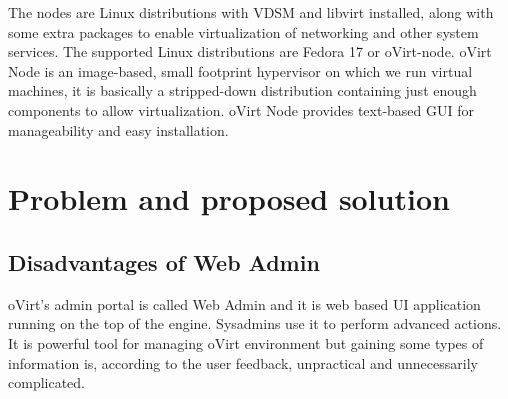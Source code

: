 The nodes are Linux distributions with VDSM and libvirt installed, along with some extra packages to enable virtualization of networking and other system services. The supported Linux distributions are Fedora 17 or oVirt-node. oVirt Node is an image-based, small footprint hypervisor on which we run virtual machines, it is basically a stripped-down distribution containing just enough components to allow virtualization. oVirt Node provides text-based GUI for manageability and easy installation.


\chapter{Problem and proposed solution} 
\label{chap_problem}

\section{Disadvantages of Web Admin}
oVirt's admin portal is called Web Admin and it is web based UI application running on the top of the engine. Sysadmins use it to perform advanced actions. It is powerful tool for managing oVirt environment but gaining some types of information is, according to the user feedback, unpractical and unnecessarily complicated.

